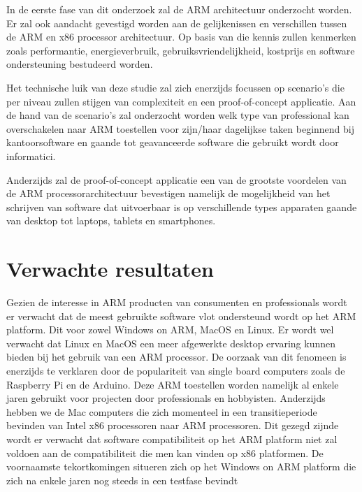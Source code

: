 In de eerste fase van dit onderzoek zal de ARM architectuur onderzocht worden. Er zal ook aandacht gevestigd worden aan de gelijkenissen en verschillen tussen de ARM en x86 processor architectuur. Op basis van die kennis zullen kenmerken zoals performantie, energieverbruik, gebruiksvriendelijkheid, kostprijs en software ondersteuning bestudeerd worden.  

Het technische luik van deze studie zal zich enerzijds focussen op scenario's die per niveau zullen stijgen van complexiteit en een proof-of-concept applicatie. Aan de hand van de scenario's zal onderzocht worden welk type van professional kan overschakelen naar ARM toestellen voor zijn/haar dagelijkse taken beginnend bij kantoorsoftware en gaande tot geavanceerde software die gebruikt wordt door informatici. 

Anderzijds zal de proof-of-concept applicatie een van de grootste voordelen van de ARM processorarchitectuur bevestigen namelijk de mogelijkheid van het schrijven van software dat uitvoerbaar is op verschillende types apparaten gaande van desktop tot laptops, tablets en smartphones.

\section{Verwachte resultaten}
\label{sec:verwachte_resultaten}

Gezien de interesse in ARM producten van consumenten en professionals wordt er verwacht dat de meest gebruikte software vlot ondersteund wordt op het ARM platform. Dit voor zowel Windows on ARM, MacOS en Linux. Er wordt wel verwacht dat Linux en MacOS een meer afgewerkte desktop ervaring kunnen bieden bij het gebruik van een ARM processor. De oorzaak van dit fenomeen is enerzijds te verklaren door de populariteit van single board computers zoals de Raspberry Pi en de Arduino. Deze ARM toestellen worden namelijk al enkele jaren gebruikt voor projecten door professionals en hobbyisten. Anderzijds hebben we de Mac computers die zich momenteel in een transitieperiode bevinden van Intel x86 processoren naar ARM processoren. Dit gezegd zijnde wordt er verwacht dat software compatibiliteit op het ARM platform niet zal voldoen aan de compatibiliteit die men kan vinden op x86 platformen. De voornaamste tekortkomingen situeren zich op het Windows on ARM platform die zich na enkele jaren nog steeds in een testfase bevindt

